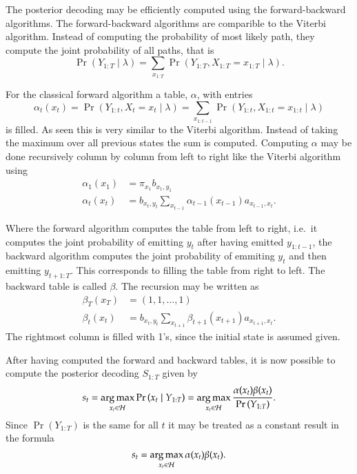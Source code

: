 The posterior decoding may be efficiently computed using the forward-backward
algorithms. The forward-backward algorithms are comparible to the Viterbi
algorithm. Instead of computing the probability of most likely path, they
compute the joint probability of all paths, that is
\begin{equation*}
  \Pr
  \left(
    Y_{1:T} \mid \lambda
  \right) = \sum_{x_{1:T}} \Pr
  \left(
    Y_{1:T}, X_{1:T} = x_{1:T} \mid \lambda
  \right).
\end{equation*}

For the classical forward algorithm a table, $\alpha$, with entries
\begin{equation*}
\alpha_t(x_t) = \Pr \left( Y_{1:t}, X_t = x_t \mid \lambda \right) =
\sum_{x_{1:t-1}} \Pr \left( Y_{1:t}, X_{1:t} = x_{1:t} \mid \lambda \right)
\end{equation*}
is filled. As seen this is very similar to the Viterbi algorithm. Instead of
taking the maximum over all previous states the sum is computed. Computing
$\alpha$ may be done recursively column by column from left to right like the
Viterbi algorithm using
\begin{equation*}
  \begin{aligned}
    \alpha_1(x_1) &= \pi_{x_1} b_{x_1, y_1} \\
    \alpha_t(x_t) &= b_{x_t, y_t} \sum_{x_{t - 1}} \alpha_{t - 1}(x_{t - 1})
    a_{x_{t - 1}, x_t}.
  \end{aligned}
\end{equation*}

Where the forward algorithm computes the table from left to right, i.e.\
it computes the joint probability of emitting $y_t$ after having emitted
$y_{1:t-1}$, the backward algorithm computes the joint probability of emmiting
$y_t$ and then emitting $y_{t+1:T}$. This corresponds to filling the table from
right to left. The backward table is called $\beta$. The recursion may be written as
\begin{equation*}
  \begin{aligned}
    \beta_T(x_T) &= (1, 1, \dots, 1) \\
    \beta_t(x_t) &= b_{x_t, y_t} \sum_{x_{t + 1}} \beta_{t + 1}(x_{t + 1})
    a_{x_{t + 1}, x_t}.
  \end{aligned}
\end{equation*}
The rightmost column is filled with 1's, since the initial state is assumed
given.

After having computed the forward and backward tables, it is now possible to
compute the posterior decoding $S_{1:T}$ given by
\begin{equation*}
  s_t = \operatorname*{arg\,max}_{x_t \in \mathcal{H}} \Pr \left(x_t \mid Y_{1:T} \right) =
  \operatorname*{arg\,max}_{x_t \in \mathcal{H}} \frac{\alpha(x_t) \beta(x_t)}{\Pr \left( Y_{1:T} \right)}.
\end{equation*}
Since $\Pr \left( Y_{1:T} \right)$ is the same for all $t$ it may be treated as
a constant result in the formula
\begin{equation*}
  s_t = \operatorname*{arg\,max}_{x_t \in \mathcal{H}} \alpha(x_t) \beta(x_t).
\end{equation*}

